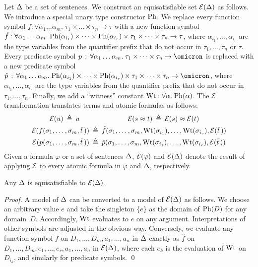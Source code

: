 Let $\mathrm{\Delta}$ be a set of sentences.
We construct an equisatisfiable set $\mathcal{E}(\mathrm{\Delta})$ as follows.
%
We introduce a special unary type constructor $\mathrm{Ph}$.
We replace every function symbol $f : \forall \alpha_1\dots\alpha_m .\; \tau_1 \times \dots \times \tau_n \to \tau$
with a new function symbol $\hat{f} : \forall \alpha_1\dots\alpha_m .\;
\mathrm{Ph}(\alpha_{i_1}) \times \dots \times \mathrm{Ph}(\alpha_{i_r}) \times
\tau_1 \times \dots \times \tau_n \to \tau$,
where $\alpha_{i_1},\dots,\alpha_{i_r}$ are the type
variables from the quantifier prefix that do not occur in
$\tau_1,\dots,\tau_n$ or $\tau$.
Every predicate symbol $p \,\ty\,
\forall \alpha_1\dots\alpha_m .\;\allowbreak \tau_1 \times \dots \times \tau_n \to \omicron$
is replaced with a new predicate symbol $\hat{p} \,\ty\,
\forall \alpha_1\dots\alpha_m .\;\allowbreak
\ghost(\alpha_{i_1}) \times \dots \times \ghost(\alpha_{i_r}) \times
\tau_1 \times \dots \times \tau_n \to \omicron$,
where $\alpha_{i_1},\dots,\alpha_{i_r}$ are the type
variables from the quantifier prefix that do not occur in
$\tau_1,\dots,\tau_n$.
Finally, we add a ``witness'' constant $\mathrm{Wt} : \forall \alpha.\;\mathrm{Ph}(\alpha)$.
The $\mathcal{E}$ transformation translates terms and atomic
formulas as follows:
\begin{align*}
\ELI(u) \eqdef u
\kern1.4em & \kern5.55em %
\ELI(s \eq t) \eqdef \ELI(s) \eq \ELI(t) \\
\ELI(f(\sigma_1,\dots,\sigma_m,\bar t\,)) &\eqdef
\hat{f}(\sigma_1,\dots,\sigma_m,\wit(\sigma_{i_1}),\dots,\wit(\sigma_{i_r}),
\ELI(\bar t\,)) \\
\ELI(p(\sigma_1,\dots,\sigma_m,\bar t\,)) &\eqdef
\hat{p}(\sigma_1,\dots,\sigma_m,\wit(\sigma_{i_1}),\dots,\wit(\sigma_{i_r}),
\ELI(\bar t\,))
\end{align*}
Given a formula $\varphi$ or a set of sentences $\mathrm{\Delta}$,
$\mathcal{E}(\varphi)$ and $\mathcal{E}(\mathrm{\Delta})$ denote the result of
applying $\mathcal{E}$ to every atomic formula in $\varphi$ and
$\mathrm{\Delta}$, respectively.

\begin{theorem} \label{thm:eli}
Any $\mathrm{\Delta}$ is equisatisfiable to $\mathcal{E}(\mathrm{\Delta})$.
\end{theorem}
\begin{proof}
A model of $\mathrm{\Delta}$ can be converted to a model of $\mathcal{E}(\mathrm{\Delta})$
as follows. We choose an arbitrary value $e$ and take the singleton
$\{ e \}$ as the domain of $\mathrm{Ph}(D)$ for any domain~$D$.
Accordingly, $\mathrm{Wt}$ evaluates to $e$ on any argument.
Interpretations of other %
symbols are adjusted in the obvious way.
%
Conversely, we evaluate any function symbol
$f$ on $D_1,\dots,D_m,a_1,\dots,a_n$ in $\mathrm{\Delta}$ exactly as
$\hat{f}$ on $D_1,\dots,D_m,\allowbreak e_1,\dots,e_r,\allowbreak a_1,\dots,a_n$
in $\mathcal{E}(\mathrm{\Delta})$,
where each $e_k$ is the evaluation of $\mathrm{Wt}$ on $D_{i_k}$, and similarly
for predicate symbols.
\qed
\end{proof}


